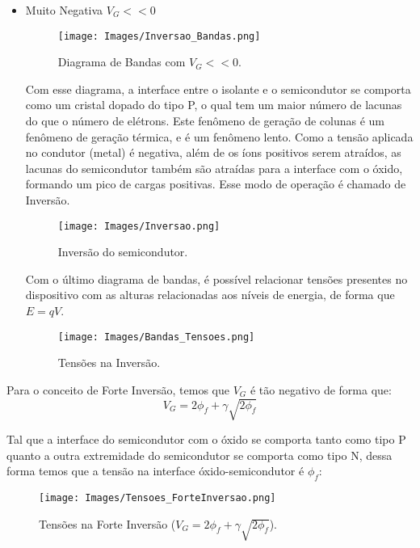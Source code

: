 \documentclass[12pt]{article}
\begin{document}
\begin{itemize}
  \item Muito Negativa $V_G << 0$
  
  \begin{figure}[H]
    \begin{center}
      \texttt{[image: Images/Inversao\_Bandas.png]}
    \end{center}
    \caption{Diagrama de Bandas com $V_G<<0$.}
  \end{figure}

  Com esse diagrama, a interface entre o isolante e o semicondutor se comporta como um cristal dopado do tipo P, o qual tem um maior número de lacunas do que o número de elétrons. Este fenômeno de geração de colunas é um fenômeno de geração térmica, e é um fenômeno lento.
	Como a tensão aplicada no condutor (metal) é negativa, além de os íons positivos serem atraídos, as lacunas do semicondutor também são atraídas para a interface com o óxido, formando um pico de cargas positivas. Esse modo de operação é chamado de Inversão. 

  \begin{figure}[H]
    \begin{center}
      \texttt{[image: Images/Inversao.png]}
    \end{center}
    \caption{Inversão do semicondutor.}
  \end{figure}

  Com o último diagrama de bandas, é possível relacionar tensões presentes no dispositivo com as alturas relacionadas aos níveis de energia, de forma que $E=qV$.

  \begin{figure}[H]
    \begin{center}
      \texttt{[image: Images/Bandas\_Tensoes.png]}
    \end{center}
    \caption{Tensões na Inversão.}
  \end{figure}

\end{itemize}

Para o conceito de Forte Inversão, temos que $V_G$ é tão negativo de forma que: 
$$
  V_G = 2\phi_f + \gamma \sqrt{2 \phi_f}
$$

Tal que a interface do semicondutor com o óxido se comporta tanto como tipo P quanto a outra extremidade do semicondutor se comporta como tipo N, dessa forma temos que a tensão na interface óxido-semicondutor é $\phi_f$:

\begin{figure}[H]
  \begin{center}
    \texttt{[image: Images/Tensoes\_ForteInversao.png]}
  \end{center}
  \caption{Tensões na Forte Inversão ($
  V_G = 2\phi_f + \gamma \sqrt{2 \phi_f}
$).}
\end{figure}
\end{document}
